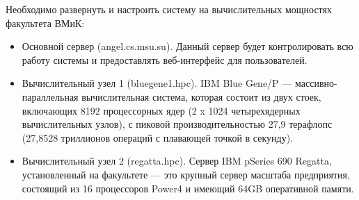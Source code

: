 Необходимо развернуть и настроить систему на вычислительных мощностях факультета ВМиК:
\begin{itemize}
  \item Основной сервер (angel.cs.msu.su). Данный сервер будет контролировать всю работу системы и предоставлять веб-интерфейс для пользователей.
  \item Вычислительный узел 1 (bluegene1.hpc). IBM Blue Gene/P — массивно-параллельная вычислительная система, которая состоит из двух стоек, включающих 8192 процессорных ядер (2 x 1024 четырехядерных вычислительных узлов), с пиковой производительностью 27,9 терафлопс (27,8528 триллионов операций с плавающей точкой в секунду).   
  \item Вычислительный узел 2 (regatta.hpc). Сервер IBM pSeries 690 Regatta, установленный на факультете --- это крупный сервер масштаба предприятия, состоящий из 16 процессоров Power4 и имеющий 64GB оперативной памяти.
\end{itemize}

 